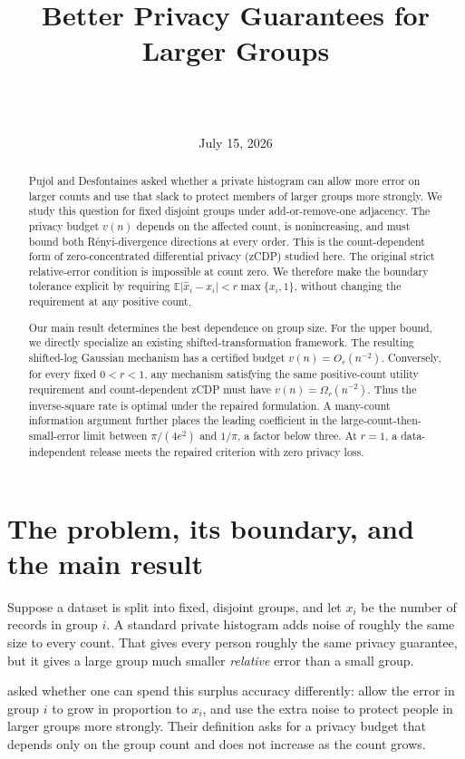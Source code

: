 \documentclass[11pt]{article}
\title{\bfseries Better Privacy Guarantees for Larger Groups}
\author{\paperauthor\\[0.25em]\small \paperaffiliation\\[-0.1em]\small \paperemail}
\date{July 15, 2026}
\newcommand{\E}{\mathbb{E}}
\theoremstyle{definition}
\begin{document}
\maketitle

\begin{abstract}
Pujol and Desfontaines asked whether a private histogram can allow more error on larger counts and use that slack to protect members of larger groups more strongly. We study this question for fixed disjoint groups under add-or-remove-one adjacency. The privacy budget $v(n)$ depends on the affected count, is nonincreasing, and must bound both R\'enyi-divergence directions at every order. This is the count-dependent form of zero-concentrated differential privacy (zCDP) studied here. The original strict relative-error condition is impossible at count zero. We therefore make the boundary tolerance explicit by requiring $\E\lvert\widehat{x}_i-x_i\rvert<r\max\{x_i,1\}$, without changing the requirement at any positive count.

Our main result determines the best dependence on group size. For the upper bound, we directly specialize an existing shifted-transformation framework. The resulting shifted-log Gaussian mechanism has a certified budget $v(n)=O_r(n^{-2})$. Conversely, for every fixed $0<r<1$, any mechanism satisfying the same positive-count utility requirement and count-dependent zCDP must have $v(n)=\Omega_r(n^{-2})$. Thus the inverse-square rate is optimal under the repaired formulation. A many-count information argument further places the leading coefficient in the large-count-then-small-error limit between $\pi/(4e^2)$ and $1/\pi$, a factor below three. At $r=1$, a data-independent release meets the repaired criterion with zero privacy loss.
\end{abstract}

\section{The problem, its boundary, and the main result}

Suppose a dataset is split into fixed, disjoint groups, and let $x_i$ be the number of records in group $i$. A standard private histogram adds noise of roughly the same size to every count. That gives every person roughly the same privacy guarantee, but it gives a large group much smaller \emph{relative} error than a small group.

\citet{PujolDesfontaines2023} asked whether one can spend this surplus accuracy differently: allow the error in group $i$ to grow in proportion to $x_i$, and use the extra noise to protect people in larger groups more strongly. Their definition asks for a privacy budget that depends only on the group count and does not increase as the count grows.
\end{document}
